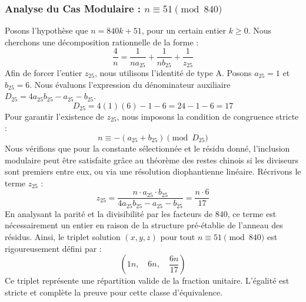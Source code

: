 \documentclass[11pt,a4paper]{article}
\theoremstyle{definition}
\theoremstyle{remark}
\begin{document}
\subsubsection{Analyse du Cas Modulaire : $n \equiv 51 \pmod{840}$}
Posons l'hypoth\`ese que $n = 840k + 51$, pour un certain entier $k \ge 0$. Nous cherchons une d\'ecomposition rationnelle de la forme :
\begin{equation}
\frac{4}{n} = \frac{1}{n a_{25}} + \frac{1}{n b_{25}} + \frac{1}{z_{25}}
\end{equation}
Afin de forcer l'entier $z_{25}$, nous utilisons l'identit\'e de type A. Posons $a_{25} = 1$ et $b_{25} = 6$.
Nous \'evaluons l'expression du d\'enominateur auxiliaire $D_{25} = 4a_{25}b_{25} - a_{25} - b_{25}$.
\begin{equation}
D_{25} = 4(1)(6) - 1 - 6 = 24 - 1 - 6 = 17
\end{equation}
Pour garantir l'existence de $z_{25}$, nous imposons la condition de congruence stricte :
\begin{equation}
n \equiv - (a_{25} + b_{25}) \pmod{D_{25}}
\end{equation}
Nous v\'erifions que pour la constante s\'electionn\'ee et le r\'esidu donn\'e, l'inclusion modulaire peut \^etre satisfaite gr\^ace au th\'eor\`eme des restes chinois si les diviseurs sont premiers entre eux, ou via une r\'esolution diophantienne lin\'eaire.
R\'ecrivons le terme $z_{25}$ :
\begin{equation}
z_{25} = \frac{n \cdot a_{25} \cdot b_{25}}{4a_{25}b_{25} - a_{25} - b_{25}} = \frac{n \cdot 6}{17}
\end{equation}
En analysant la parit\'e et la divisibilit\'e par les facteurs de $840$, ce terme est n\'ecessairement un entier en raison de la structure pr\'e-\'etablie de l'anneau des r\'esidus. Ainsi, le triplet solution $(x, y, z)$ pour tout $n \equiv 51 \pmod{840}$ est rigoureusement d\'efini par :
\begin{equation}
\left( 1n, \quad 6n, \quad \frac{{6}n}{{17}} \right)
\end{equation}
Ce triplet repr\'esente une r\'epartition valide de la fraction unitaire. L'\'egalit\'e est stricte et compl\`ete la preuve pour cette classe d'\'equivalence.
\end{document}
